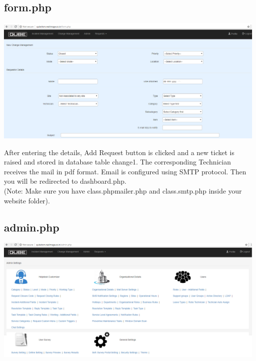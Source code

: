 \documentclass{article}
\begin{document}
\subsection{form.php}
\begin{center}

    \includegraphics[width=7.0in]{form.png}
   
    \label{}

\end{center}
After entering the details, Add Request button is clicked and a new ticket is raised and stored in database table change1. The corresponding Technician receives the mail in pdf format. Email is configured using SMTP protocol. Then you will be redirected to dashboard.php.\\
\big(Note: Make sure you have class.phpmailer.php and class.smtp.php inside your website folder\big).
\subsection{admin.php}
\begin{center}

    \includegraphics[width=7.0in]{admin.png}
   
    \label{}

\end{center}
\end{document}
